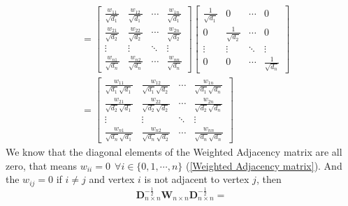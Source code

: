 \documentclass[oneside]{book}
\begin{document}
{{\begin{align}
                &=
                \begin{bmatrix}
                    \frac{w_{11}}{\sqrt{d_{1}}} & \frac{w_{12}}{\sqrt{d_{1}}} & \cdots & \frac{w_{1n}}{\sqrt{d_{1}}}\\
                    \frac{w_{21}}{\sqrt{d_{2}}} & \frac{w_{22}}{\sqrt{d_{2}}} & \cdots & \frac{w_{2n}}{\sqrt{d_{2}}}\\
                    \vdots                      & \vdots                      & \ddots & \vdots\\
                    \frac{w_{n1}}{\sqrt{d_{n}}} & \frac{w_{n2}}{\sqrt{d_{n}}} & \cdots & \frac{w_{nn}}{\sqrt{d_{n}}}
                \end{bmatrix}
                \begin{bmatrix}
                    \frac{1}{\sqrt{d_{1}}} & 0                      & \cdots & 0\\
                    0                      & \frac{1}{\sqrt{d_{2}}} & \cdots & 0\\
                    \vdots                 & \vdots                 & \ddots & \vdots\\
                    0                      & 0                      & \cdots & \frac{1}{\sqrt{d_{n}}}
                \end{bmatrix}\\
                &=
                \begin{bmatrix}
                    \frac{w_{11}}{\sqrt{d_{1}}\sqrt{d_{1}}} & \frac{w_{12}}{\sqrt{d_{1}}\sqrt{d_{2}}} & \cdots & \frac{w_{1n}}{\sqrt{d_{1}}\sqrt{d_{n}}}\\
                    \frac{w_{21}}{\sqrt{d_{2}}\sqrt{d_{1}}} & \frac{w_{22}}{\sqrt{d_{2}}\sqrt{d_{2}}} & \cdots & \frac{w_{2n}}{\sqrt{d_{2}}\sqrt{d_{n}}}\\
                    \vdots                                  & \vdots                                  & \ddots & \vdots\\
                    \frac{w_{n1}}{\sqrt{d_{n}}\sqrt{d_{1}}} & \frac{w_{n2}}{\sqrt{d_{n}}\sqrt{d_{2}}} & \cdots & \frac{w_{nn}}{\sqrt{d_{n}}\sqrt{d_{n}}}
                \end{bmatrix}
        \end{align}
        We know that the diagonal elements of the Weighted Adjacency matrix are all zero, that means $w_{ii}=0\ \ \forall i \in \{0,1,\cdots,n\}$ (\ref{Weighted Adjacency matrix}). And the $w_{ij}=0$ if $i \neq j$ and vertex $i$ is not adjacent to vertex $j$, then
        \[
            \mathbf{D}_{n \times n}^{-\frac{1}{2}}\mathbf{W}_{n \times n}\mathbf{D}_{n \times n}^{-\frac{1}{2}}=
\]}}
\end{document}
